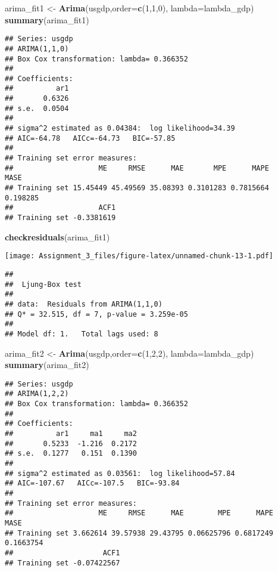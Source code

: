 \documentclass[]{article}
\newenvironment{Shaded}{\begin{snugshade}}{\end{snugshade}}
\newcommand{\KeywordTok}[1]{\textcolor[rgb]{0.13,0.29,0.53}{\textbf{#1}}}
\newcommand{\DataTypeTok}[1]{\textcolor[rgb]{0.13,0.29,0.53}{#1}}
\newcommand{\DecValTok}[1]{\textcolor[rgb]{0.00,0.00,0.81}{#1}}
\newcommand{\StringTok}[1]{\textcolor[rgb]{0.31,0.60,0.02}{#1}}
\newcommand{\NormalTok}[1]{#1}
\begin{document}
\begin{Shaded}
\begin{Highlighting}[]
\NormalTok{arima_fit1 <-}\StringTok{ }\KeywordTok{Arima}\NormalTok{(usgdp,}\DataTypeTok{order=}\KeywordTok{c}\NormalTok{(}\DecValTok{1}\NormalTok{,}\DecValTok{1}\NormalTok{,}\DecValTok{0}\NormalTok{), }\DataTypeTok{lambda=}\NormalTok{lambda_gdp)}
\KeywordTok{summary}\NormalTok{(arima_fit1)}
\end{Highlighting}
\end{Shaded}

\begin{verbatim}
## Series: usgdp 
## ARIMA(1,1,0) 
## Box Cox transformation: lambda= 0.366352 
## 
## Coefficients:
##          ar1
##       0.6326
## s.e.  0.0504
## 
## sigma^2 estimated as 0.04384:  log likelihood=34.39
## AIC=-64.78   AICc=-64.73   BIC=-57.85
## 
## Training set error measures:
##                    ME     RMSE      MAE       MPE      MAPE     MASE
## Training set 15.45449 45.49569 35.08393 0.3101283 0.7815664 0.198285
##                    ACF1
## Training set -0.3381619
\end{verbatim}

\begin{Shaded}
\begin{Highlighting}[]
\KeywordTok{checkresiduals}\NormalTok{(arima_fit1)}
\end{Highlighting}
\end{Shaded}

\texttt{[image: Assignment\_3\_files/figure-latex/unnamed-chunk-13-1.pdf]}

\begin{verbatim}
## 
##  Ljung-Box test
## 
## data:  Residuals from ARIMA(1,1,0)
## Q* = 32.515, df = 7, p-value = 3.259e-05
## 
## Model df: 1.   Total lags used: 8
\end{verbatim}

\begin{Shaded}
\begin{Highlighting}[]
\NormalTok{arima_fit2 <-}\StringTok{ }\KeywordTok{Arima}\NormalTok{(usgdp,}\DataTypeTok{order=}\KeywordTok{c}\NormalTok{(}\DecValTok{1}\NormalTok{,}\DecValTok{2}\NormalTok{,}\DecValTok{2}\NormalTok{), }\DataTypeTok{lambda=}\NormalTok{lambda_gdp)}
\KeywordTok{summary}\NormalTok{(arima_fit2)}
\end{Highlighting}
\end{Shaded}

\begin{verbatim}
## Series: usgdp 
## ARIMA(1,2,2) 
## Box Cox transformation: lambda= 0.366352 
## 
## Coefficients:
##          ar1     ma1     ma2
##       0.5233  -1.216  0.2172
## s.e.  0.1277   0.151  0.1390
## 
## sigma^2 estimated as 0.03561:  log likelihood=57.84
## AIC=-107.67   AICc=-107.5   BIC=-93.84
## 
## Training set error measures:
##                    ME     RMSE      MAE        MPE      MAPE      MASE
## Training set 3.662614 39.57938 29.43795 0.06625796 0.6817249 0.1663754
##                     ACF1
## Training set -0.07422567
\end{verbatim}
\end{document}

